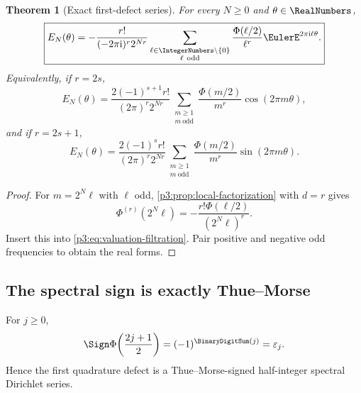 \documentclass[11pt,oneside]{article}
\numberwithin{equation}{section}
\newtheorem{theorem}{Theorem}[section]
\theoremstyle{definition}
\theoremstyle{remark}
\newcommand{\eps}{\varepsilon}
\begin{document}
\begin{theorem}[Exact first-defect series]
\label{p3:thm:first-defect}
For every $N\ge0$ and $\theta\in\RealNumbers$,
\begin{equation}
 \boxed{\displaystyle
 E_N(\theta)
 =-\frac{r!}{(-2\pi\iu)^r2^{Nr}}
 \sum_{\substack{\ell\in\IntegerNumbers\setminus\{0\}\\\ell\ \mathrm{odd}}}
 \frac{\Phi(\ell/2)}{\ell^r}
 \EulerE^{2\pi\iu\ell\theta}.}
 \label{p3:eq:first-defect-complex}
\end{equation}
Equivalently, if $r=2s$,
\begin{equation}
 E_N(\theta)
 =\frac{2(-1)^{s+1}r!}{(2\pi)^r2^{Nr}}
 \sum_{\substack{m\ge1\\m\ \mathrm{odd}}}
 \frac{\Phi(m/2)}{m^r}\cos(2\pi m\theta),
 \label{p3:eq:first-defect-even}
\end{equation}
and if $r=2s+1$,
\begin{equation}
 E_N(\theta)
 =\frac{2(-1)^sr!}{(2\pi)^r2^{Nr}}
 \sum_{\substack{m\ge1\\m\ \mathrm{odd}}}
 \frac{\Phi(m/2)}{m^r}\sin(2\pi m\theta).
 \label{p3:eq:first-defect-odd}
\end{equation}
\end{theorem}

\begin{proof}
For $m=2^N\ell$ with $\ell$ odd, \cref{p3:prop:local-factorization} with $d=r$ gives
\begin{equation}
 \Phi^{(r)}(2^N\ell)
 =-\frac{r!\Phi(\ell/2)}{(2^N\ell)^r}.
 \label{p3:eq:first-zero-jet}
\end{equation}
Insert this into \eqref{p3:eq:valuation-filtration}.  Pair positive and negative odd frequencies to obtain the real forms.
\end{proof}

\subsection{The spectral sign is exactly Thue--Morse}

\begin{proposition}
\label{p3:prop:half-integer-sign}
For $j\ge0$,
\begin{equation}
 \Sign\Phi\!\left(\frac{2j+1}{2}\right)
 =(-1)^{\BinaryDigitSum(j)}=\eps_j.
 \label{p3:eq:half-integer-sign}
\end{equation}
Hence the first quadrature defect is a Thue--Morse-signed half-integer spectral Dirichlet series.
\end{proposition}
\end{document}
